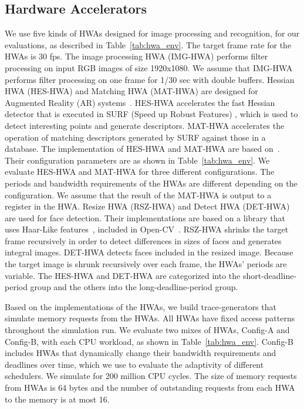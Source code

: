 \documentclass[10pt,letterpaper]{article}
\newcommand{\TMP}[1]{#1}
\begin{document}
\subsection{Hardware Accelerators}\label{sec:HWAs}
We use five kinds of HWAs designed for image processing and recognition, for our
evaluations, as described in Table~\ref{tab:hwa_env}. The target frame rate for
the HWAs is 30 fps.  The image processing HWA (IMG-HWA) performs filter
processing on input RGB images of size 1920x1080. We assume that IMG-HWA
performs filter processing on one frame for 1/30 sec with double buffers.
Hessian HWA (HES-HWA) and Matching HWA (MAT-HWA) are designed for Augmented
Reality (AR) systems~\cite{mra}. HES-HWA accelerates the fast Hessian detector
that is executed in SURF (Speed up Robust Features) \cite{surf}, which is used
to detect interesting points and generate descriptors. MAT-HWA accelerates the
operation of matching descriptors generated by SURF against those in a database.
The implementation of HES-HWA and MAT-HWA are based on~\cite{mra}. Their
configuration parameters are as shown in Table~\ref{tab:hwa_env}. 
We evaluate HES-HWA and MAT-HWA for three different
configurations. The periods and bandwidth requirements of the HWAs are different depending on
the configuration.
\TMP{We assume that
the result of the MAT-HWA is output to a register in the HWA.}
Resize HWA (RSZ-HWA) and Detect HWA (DET-HWA) are used for face detection. Their
implementations are based on a library that uses Haar-Like
features~\cite{haarlike}, included in Open-CV~\cite{opencv}. RSZ-HWA shrinks the
target frame recursively in order to detect differences in sizes of faces and
generates integral images. DET-HWA detects faces included in the resized image.
Because the target image is shrunk recursively over each frame, the HWAs'
periods are variable. 
The HES-HWA and DET-HWA are categorized into
the short-deadline-period group and the others into the long-deadline-period
group.

Based on the implementations of the HWAs, we build trace-generators that
simulate memory requests from the HWAs. All HWAs have fixed access patterns
throughout the simulation run. We evaluate two mixes of HWAs, Config-A and
Config-B, with each CPU workload, as shown in Table~\ref{tab:hwa_env}. 
\TMP{Config-B
includes HWAs that dynamically change their bandwidth requirements and deadlines over time,
which we use to evaluate the adaptivity of different schedulers. }
We simulate for
200 million CPU cycles.
The size of memory requests from HWAs is 64 bytes and the
number of outstanding requests from each HWA to the memory is at most 16.
\end{document}
